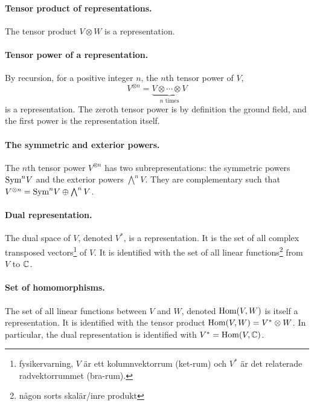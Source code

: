 	\paragraph{Tensor product of representations.} The tensor product $V \otimes W$ is a representation.
	
	\paragraph{Tensor power of a representation.} By recursion, for a positive integer $n$, the $n$th tensor power of $V$,
	\[
		V^{\otimes n} = \underset{n \text{ times}}{\underbrace{V \otimes \cdots \otimes V}}
	\]
	is a representation. The zeroth tensor power is by definition the ground field, and the first power is the representation itself. 
	
	\paragraph{The symmetric and exterior powers.} The $n$th tensor power $V^{\otimes n}$ has two  subrepresentations: the symmetric powers $\text{Sym}^n V$ and the exterior powers $ \bigwedge^n V$. They are complementary such that $V^{\otimes n} = \text{Sym}^n V \oplus \bigwedge^n V$.
	
	\paragraph{Dual representation.} The dual space of $V$, denoted $V^*$, is a representation. It is the set of all complex transposed vectors\footnote{fysikervarning, $V$ är ett kolumnvektorrum (ket-rum) och $V^*$ är det relaterade radvektorrummet (bra-rum).} of $V$. It is identified with the set of all linear functions\footnote{någon sorts skalär/inre produkt} from $V$ to $\mathbb{C}$.
	
	\paragraph{Set of homomorphisms.} The set of all linear functions between $V$ and $W$, denoted $\text{Hom}(V,W)$ is itself a representation. It is identified with the tensor product $\text{Hom}(V,W) = V^* \otimes W$. In particular, the dual representation is identified with $V^* = \text{Hom}(V,\mathbb{C})$.
	
	
	
	